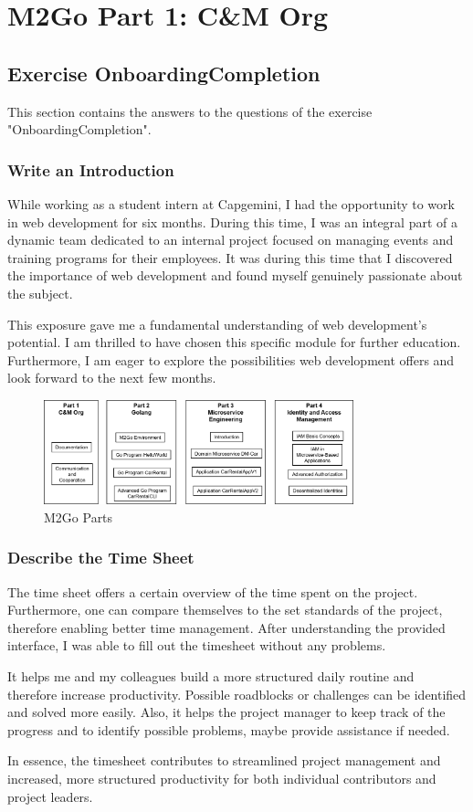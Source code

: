 \chapter{M2Go Part 1: C\&M Org}
\label{cha:cm_org}

\section{Exercise OnboardingCompletion}
This section contains the answers to the questions of the exercise "OnboardingCompletion".

\subsection{Write an Introduction}
While working as a student intern at Capgemini, I had the opportunity to work in web development for six months.
During this time, I was an integral part of a dynamic team dedicated to an internal project focused on managing events and training programs for their employees.
It was during this time that I discovered the importance of web development and found myself genuinely passionate about the subject.

This exposure gave me a fundamental understanding of web development's potential.
I am thrilled to have chosen this specific module for further education. 
Furthermore, I am eager to explore the possibilities web development offers and look forward to the next few months.

\begin{figure}[H]
    \centering
    \includegraphics[width=0.8\textwidth]{figures/m2go_parts.png}
    \caption{M2Go Parts}
    \label{fig:m2go_parts}
\end{figure}

\subsection{Describe the Time Sheet}
The time sheet offers a certain overview of the time spent on the project. 
Furthermore, one can compare themselves to the set standards of the project, therefore enabling better time management.
After understanding the provided interface, I was able to fill out the timesheet without any problems.

It helps me and my colleagues build a more structured daily routine and therefore increase productivity. Possible roadblocks or challenges can be identified and solved more easily.
Also, it helps the project manager to keep track of the progress and to identify possible problems, maybe provide assistance if needed.

In essence, the timesheet contributes to streamlined project management and increased, more structured productivity for both individual contributors and project leaders.